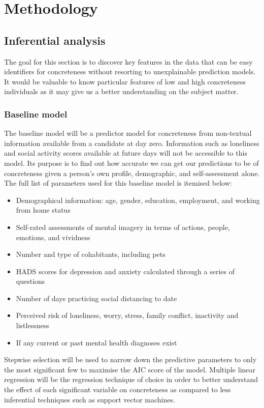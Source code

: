 \documentclass[12pt, a4paper]{article}
\begin{document}
\section{Methodology}

\subsection{Inferential analysis}

The goal for this section is to discover key features in the data that can be easy identifiers for concreteness without resorting to unexplainable prediction models. It would be valuable to know particular features of low and high concreteness individuals as it may give us a better understanding on the subject matter.

\subsubsection{Baseline model}
The baseline model will be a predictor model for concreteness from non-textual information available from a candidate at day zero. Information such as loneliness and social activity scores available at future days will not be accessible to this model. Its purpose is to find out how accurate we can get our predictions to be of concreteness given a person's own profile, demographic, and self-assessment alone. The full list of parameters used for this baseline model is itemised below: 

\begin{itemize}
  \item Demographical information: age, gender, education, employment, and working from home status
  \item Self-rated assessments of mental imagery in terms of actions, people, emotions, and vividness
  \item Number and type of cohabitants, including pets
  \item HADS scores for depression and anxiety calculated through a series of questions
  \item Number of days practicing social distancing to date
  \item Perceived risk of loneliness, worry, stress, family conflict, inactivity and listlessness
  \item If any current or past mental health diagnoses exist

\end{itemize}

Stepwise selection will be used to narrow down the predictive parameters to only the most significant few to maximise the AIC score of the model. Multiple linear regression will be the regression technique of choice in order to better understand the effect of each significant variable on concreteness as compared to less inferential techniques such as support vector machines. 
\end{document}
